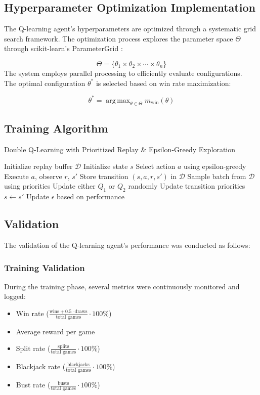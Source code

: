\documentclass[10pt]{article}
\theoremstyle{definition}
\DeclareMathOperator*{\argmax}{arg\,max}
\begin{document}
\subsection{Hyperparameter Optimization Implementation}

The Q-learning agent's hyperparameters are optimized through a systematic grid search framework. 
The optimization process explores the parameter space $\Theta$ through scikit-learn's ParameterGrid \cite{scikit_parametergrid}:

\[
\Theta = \{\theta_1 \times \theta_2 \times \cdots \times \theta_n\}
\]
The system employs parallel processing to efficiently evaluate configurations.\\
The optimal configuration $\theta^*$ is selected based on win rate maximization:

\[
\theta^* = \argmax_{\theta \in \Theta} m_{\text{win}}(\theta)
\]
\subsection{Training Algorithm}
\begin{algorithm}[H]
\caption{Double Q-Learning with Prioritized Replay \& Epsilon-Greedy Exploration}
\begin{algorithmic}[1]
\State Initialize replay buffer $\mathcal{D}$
    \State Initialize state $s$
        \State Select action $a$ using epsilon-greedy
        \State Execute $a$, observe $r$, $s'$
        \State Store transition $(s,a,r,s')$ in $\mathcal{D}$
            \State Sample batch from $\mathcal{D}$ using priorities
            \State Update either $Q_1$ or $Q_2$ randomly
            \State Update transition priorities
        \EndIf
        \State $s \gets s'$
    \EndWhile
    \State Update $\epsilon$ based on performance
\EndFor
\end{algorithmic}
\end{algorithm}
\subsection{Validation}
The validation of the Q-learning agent's performance was conducted as follows:
\subsubsection{Training Validation}
During the training phase, several metrics were continuously monitored and logged:
\begin{itemize}
    \item Win rate ($\frac{\text{wins} + 0.5 \cdot \text{draws}}{\text{total games}} \cdot 100\%$)
    \item Average reward per game
    \item Split rate ($\frac{\text{splits}}{\text{total games}} \cdot 100\%$)
    \item Blackjack rate ($\frac{\text{blackjacks}}{\text{total games}} \cdot 100\%$)
    \item Bust rate ($\frac{\text{busts}}{\text{total games}} \cdot 100\%$)
\end{itemize}
\end{document}
